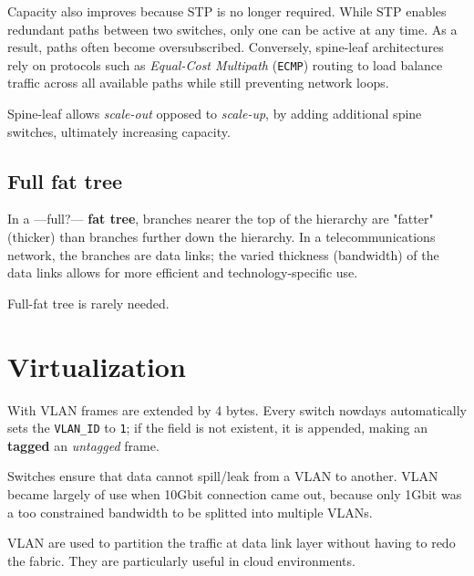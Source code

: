 Capacity also improves because STP is no longer required. While STP enables redundant paths between two switches, only one can be active at any time. As a result, paths often become oversubscribed. 
Conversely, spine-leaf architectures rely on protocols such as \textit{Equal-Cost Multipath} (\texttt{ECMP}) routing to load balance traffic across all available paths while still preventing network loops.

Spine-leaf allows \textit{scale-out} opposed to \textit{scale-up}, by adding additional spine switches, ultimately increasing capacity.

\subsection{Full fat tree}
In a ---full?--- \textbf{fat tree}, branches nearer the top of the hierarchy are "fatter" (thicker) than branches further down the hierarchy. In a telecommunications network, the branches are data links; the varied thickness (bandwidth) of the data links allows for more efficient and technology-specific use.

Full-fat tree is rarely needed.

\section{Virtualization}

With VLAN frames are extended by 4 bytes. Every switch nowdays automatically sets the \texttt{VLAN\_ID} to \texttt{1}; if the field is not existent, it is appended, making an \textbf{tagged} an \textit{untagged} frame.

Switches ensure that data cannot spill/leak from a VLAN to another.
VLAN became largely of use when 10Gbit connection came out, because only 1Gbit was a too constrained bandwidth to be splitted into multiple VLANs. 

VLAN are used to partition the traffic at data link layer without having to redo the fabric. They are particularly useful in cloud environments.

